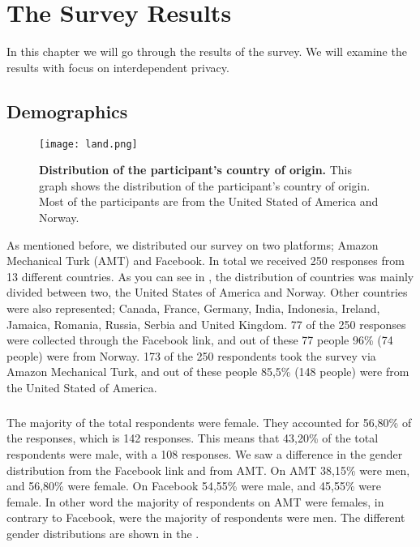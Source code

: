 \chapter{The Survey Results}
\label{chp:surveyresults} 

In this chapter we will go through the results of the survey.  We will examine the results with focus on interdependent privacy. 


\section{Demographics}

\begin{figure}[h!]
\centering
\texttt{[image: land.png]}
\caption[Distribution of the participant's country of origin]{\textbf{Distribution of the participant's country of origin.} This graph shows the distribution of the participant's country of origin. Most of the participants are from the United Stated of America and Norway.} 
\label{fig:land}
\end{figure}


As mentioned before, we distributed our survey on two platforms; Amazon Mechanical Turk (AMT) and Facebook. In total we received 250 responses from 13 different countries. As you can see in , the distribution of countries was mainly divided between two, the United States of America and Norway. Other countries were also represented; Canada, France, Germany, India, Indonesia, Ireland, Jamaica, Romania, Russia, Serbia and United Kingdom. 77 of the 250 responses were collected through the Facebook link, and out of these 77 people 96\% (74 people) were from Norway. 173 of the 250 respondents took the survey via Amazon Mechanical Turk, and out of these people 85,5\% (148 people) were from the United Stated of America. 

\paragraph{}
The majority of the total respondents were female. They accounted for 56,80\% of the responses, which is 142 responses. This means that 43,20\% of the total respondents were male, with a 108 responses. We saw a difference in the gender distribution from the Facebook link and from AMT. On AMT 38,15\% were men, and 56,80\% were female. On Facebook 54,55\% were male, and 45,55\% were female. In other word the majority of respondents on AMT were females, in contrary to Facebook, were the majority of respondents were men. The different gender distributions are shown in the .

